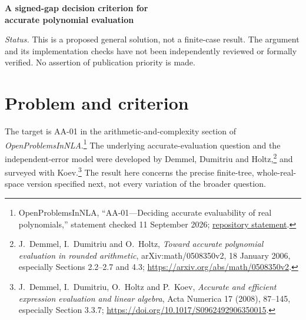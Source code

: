 \documentclass[11pt,a4paper]{article}
\theoremstyle{definition}
\theoremstyle{remark}
\begin{document}
\begin{center}
{\LARGE\bfseries A signed-gap decision criterion for\\[3pt] accurate polynomial evaluation}
\end{center}
\vspace{0.3em}
\begin{abstract}
A finite criterion is proposed for the existence of accurate evaluation algorithms
for real polynomials in the constant-free, independently rounded arithmetic model.
For each ordering of the input magnitudes and each choice of their signs, write
the inputs as signed cumulative sums of nonnegative gaps. Expand the given
polynomial in these gaps. The criterion requires that the polynomial obtained
by taking the absolute values of its coefficients be bounded by a constant times
the absolute value of the polynomial itself, on the entire nonnegative orthant.
The proof below establishes necessity by constructing a separated execution of
an arbitrary finite branching program, then replaying it under multiplicative
gap perturbations while holding every rounded value fixed. Polynomial
interpolation yields coefficient domination. Sufficiency follows from direct
evaluation in gap coordinates. The criterion is a finite collection of
first-order sentences over the reals, so real quantifier elimination gives an
always-halting decision procedure for AA-01. Stored values, exact negation,
equality branches, nonhomogeneous polynomials, and boundary points are included.
\end{abstract}

\emph{Status.} This is a proposed general solution, not a finite-case result.
The argument and its implementation checks have not been independently reviewed
or formally verified. No assertion of publication priority is made.

\section{Problem and criterion}

The target is AA-01 in the arithmetic-and-complexity section of
\emph{OpenProblemsInNLA}.\footnote{\label{fn:repo}OpenProblemsInNLA,
``AA-01---Deciding accurate evaluability of real polynomials,'' statement checked
11 September 2026;
\href{https://raw.githubusercontent.com/ajt60gaibb/OpenProblemsInNLA/main/arithmetic-and-complexity/AA-01/README.md}{repository statement}.}
The underlying accurate-evaluation question and the independent-error model
were developed by Demmel, Dumitriu and Holtz,\footnote{\label{fn:ddh}J.~Demmel,
I.~Dumitriu and O.~Holtz, \emph{Toward accurate polynomial evaluation in rounded
arithmetic}, arXiv:math/0508350v2, 18 January 2006, especially Sections 2.2--2.7 and
4.3; \url{https://arxiv.org/abs/math/0508350v2}.}
and surveyed with Koev.\footnote{\label{fn:acta}J.~Demmel, I.~Dumitriu,
O.~Holtz and P.~Koev, \emph{Accurate and efficient expression evaluation and
linear algebra}, Acta Numerica 17 (2008), 87--145, especially Section 3.3.7;
\url{https://doi.org/10.1017/S0962492906350015}.}
The result here concerns the precise finite-tree, whole-real-space version
specified next, not every variation of the broader question.
\end{document}
